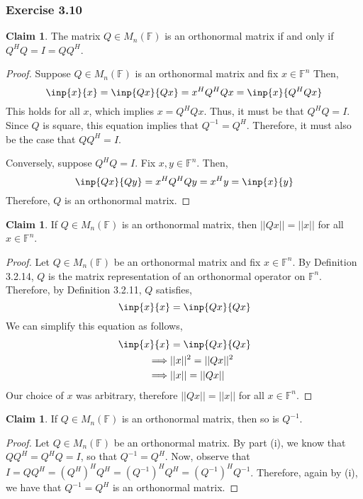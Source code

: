 \documentclass[letterpaper,12pt]{article}
\theoremstyle{definition}
\newtheorem{claim}[theorem]{Claim}
\begin{document}
\subsubsection*{Exercise 3.10} 
\begin{claim}
	The matrix $Q \in M_n(\mathbb{F})$ is an orthonormal matrix if and only if $Q^HQ = I = QQ^H$. 
\end{claim}
\begin{proof}
	
	Suppose $Q \in M_n(\mathbb{F})$ is an orthonormal matrix and fix $x \in \mathbb{F}^n$  Then, 
	\begin{equation}
		\inp{x}{x} = \inp{Qx}{Qx} = x^HQ^HQx = \inp{x}{Q^HQx}
	\end{equation}
	This holds for all $x$, which implies $x = Q^HQx$. Thus, it must be that $Q^HQ = I$. Since $Q$ is square, this equation implies that $Q^{-1} = Q^H$. Therefore, it must also be the case that $QQ^H = I$. 

	Conversely, suppose $Q^HQ = I$.  Fix $x, y \in \mathbb{F}^n$. Then,
	\begin{equation}
	\inp{Qx}{Qy} = x^HQ^HQy = x^Hy = \inp{x}{y}
	\end{equation}
	Therefore, $Q$ is an orthonormal matrix.
\end{proof}

\begin{claim}
If $Q \in M_n(\mathbb{F})$ is an orthonormal matrix, then $||Qx|| = ||x||$ for all $x \in \mathbb{F}^n$. 
\end{claim}
\begin{proof}
Let $Q \in M_n(\mathbb{F})$ be an orthonormal matrix and fix $x \in \mathbb{F}^n$. By Definition 3.2.14, $Q$ is the matrix representation of an orthonormal operator on $\mathbb{F}^n$. Therefore, by Definition 3.2.11, $Q$ satisfies,
\begin{equation}
	\inp{x}{x} = \inp{Qx}{Qx}
\end{equation}
We can simplify this equation as follows,
\begin{align*}
\inp{x}{x} &= \inp{Qx}{Qx} \\
	\implies  &||x||^2 = ||Qx||^2 \\
	\implies &||x|| = ||Qx||
\end{align*}
Our choice of $x$ was arbitrary, therefore $||Qx|| = ||x||$ for all $x \in \mathbb{F}^n$. 
\end{proof}

\begin{claim}
	If $Q \in M_n(\mathbb{F})$ is an orthonormal matrix, then so is $Q^{-1}$.
\end{claim}
\begin{proof}
	Let $Q \in M_n(\mathbb{F})$ be an orthonormal matrix. By part (i), we know that $QQ^H = Q^HQ = I$, so that $Q^{-1} = Q^H$. Now, observe that $ I = QQ^H = (Q^H)^H Q^H = (Q^{-1})^H Q^H = (Q^{-1})^H Q^{-1}$. Therefore, again by (i), we have that $Q^{-1} = Q^H$ is an orthonormal matrix.
\end{proof}
\end{document}
